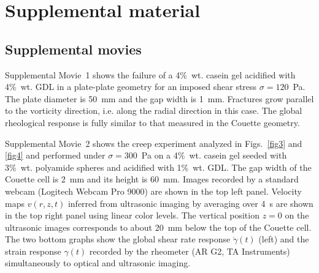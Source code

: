 \documentclass[twocolumn,superscriptaddress,showpacs,preprintnumbers,amsmath,amssymb,prl]{revtex4}
\newcommand\gp{\dot\gamma}
\begin{document}
\begin{thebibliography}{}





\end{thebibliography}

\clearpage
\newpage
\setcounter{figure}{0}

\section*{\large Supplemental material}

\subsection*{Supplemental movies}

Supplemental Movie~1 shows the failure of a 4\%~wt. casein gel acidified with 4\%~wt. GDL in a plate-plate geometry for an imposed shear stress $\sigma=120$~Pa. The plate diameter is 50~mm and the gap width is 1~mm. Fractures grow parallel to the vorticity direction, i.e. along the radial direction in this case. The global rheological response is fully similar to that measured in the Couette geometry.

Supplemental Movie~2 shows the creep experiment analyzed in Figs.~\ref{fig3} and \ref{fig4} and performed under $\sigma=300$~Pa on a 4\%~wt. casein gel seeded with 3\%~wt. polyamide spheres and acidified with 1\%~wt. GDL. The gap width of the Couette cell is 2~mm and its height is 60~mm. Images recorded by a standard webcam (Logitech Webcam Pro 9000) are shown in the top left panel. Velocity maps $v(r,z,t)$ inferred from ultrasonic imaging by averaging over 4~s are shown in the top right panel using linear color levels. The vertical position $z=0$ on the ultrasonic images corresponds to about 20~mm below the top of the Couette cell. The two bottom graphs show the global shear rate response $\gp(t)$ (left) and the strain response $\gamma(t)$ recorded by the rheometer (AR G2, TA Instruments) simultaneously to optical and ultrasonic imaging.
\end{document}
